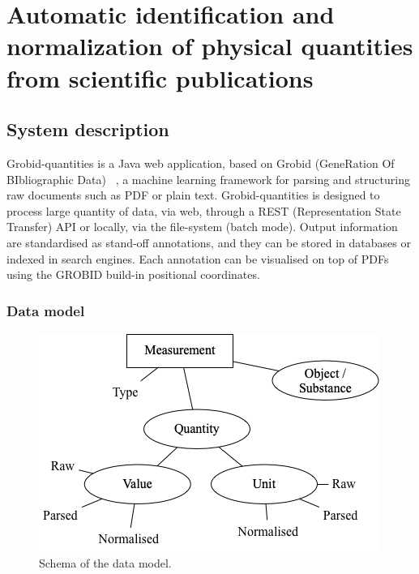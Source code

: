\chapter{Automatic identification and normalization of physical quantities from scientific publications}


\section{System description}
\label{sec:system}
Grobid-quantities is a Java web application, based on Grobid (GeneRation Of BIbliographic Data)~\cite{GROBID} \cite{lopez2009grobid}, a machine learning framework for parsing and structuring raw documents such as PDF or plain text. 
Grobid-quantities is designed to process large quantity of data, via web, through a REST (Representation State Transfer) API or locally, via the file-system (batch mode). 
Output information are standardised as stand-off annotations, and they can be stored in databases or indexed in search engines. Each annotation can be visualised on top of PDFs using the GROBID build-in positional coordinates.

\subsection{Data model}
\label{subsub:data-model}
\begin{figure}[ht]
  \centering
  \includegraphics[width=\linewidth]{figures/quantities/schema-2.png}
  \caption{Schema of the data model.}
  \label{fig:data-model-schema-2}
\end{figure}

